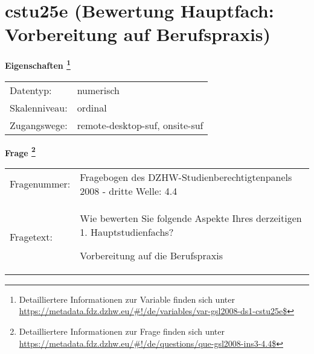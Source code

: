 
    \setcounter{footnote}{0}

    \vspace*{-1.8cm}
	\section{cstu25e (Bewertung Hauptfach: Vorbereitung auf Berufspraxis)}
	\label{section:cstu25e}



    \vspace*{0.5cm}
    \noindent\textbf{Eigenschaften
	\footnote{Detailliertere Informationen zur Variable finden sich unter
		\url{https://metadata.fdz.dzhw.eu/\#!/de/variables/var-gsl2008-ds1-cstu25e$}}}\\
	\begin{tabularx}{\hsize}{@{}lX}
	Datentyp: & numerisch \\
	Skalenniveau: & ordinal \\
	Zugangswege: &
	  remote-desktop-suf, 
	  onsite-suf
 \\
    \end{tabularx}



				\vspace*{0.5cm}
                \noindent\textbf{Frage
	                \footnote{Detailliertere Informationen zur Frage finden sich unter
		              \url{https://metadata.fdz.dzhw.eu/\#!/de/questions/que-gsl2008-ins3-4.4$}}}\\
				\begin{tabularx}{\hsize}{@{}lX}
					Fragenummer: &
					  Fragebogen des DZHW-Studienberechtigtenpanels 2008 - dritte Welle:
					  4.4
 \\
					Fragetext: & Wie bewerten Sie folgende Aspekte Ihres derzeitigen 1. Hauptstudienfachs?\par  Vorbereitung auf die Berufspraxis \\
				\end{tabularx}





